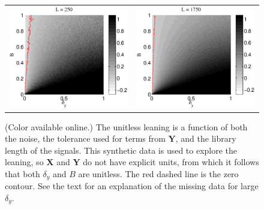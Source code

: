 \documentclass[a4paper,11pt,twocolumn]{article}
\begin{document}
\begin{figure}[ht]
\begin{tabular}{cc}
\includegraphics[scale=0.30]{SimpleIRexample_diffLpart3.eps} &
\includegraphics[scale=0.30]{SimpleIRexample_diffLpart4.eps}
\end{tabular}
\caption{(Color available online.) The unitless leaning is a function of both the noise, the tolerance used for terms from $\mathbf{Y}$, and the library length of the signals.  This synthetic data is used to explore the leaning, so $\mathbf{X}$ and $\mathbf{Y}$ do not have explicit units, from which it follows that both $\delta_y$ and $B$ are unitless.  The red dashed line is the zero contour.  See the text for an explanation of the missing data for large $\delta_y$.}
\label{fig:IRexChangeL}
\end{figure}
\end{document}
